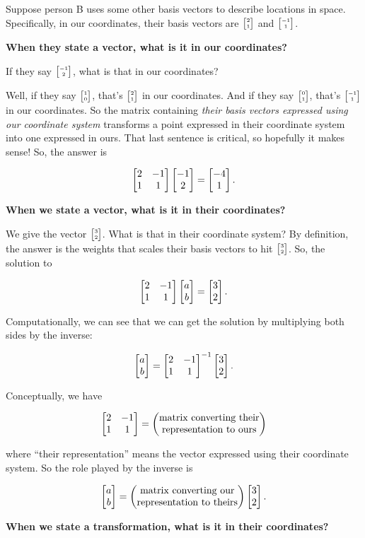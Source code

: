 Suppose person B uses some other basis vectors to describe locations in
space. Specifically, in our coordinates, their basis vectors are
$\tiny{\begin{bmatrix}2\\1\end{bmatrix}}$ and $\tiny{\begin{bmatrix}-1\\1\end{bmatrix}}$.


\textbf{When they state a vector, what is it in our coordinates?}

If they say $\tiny{\begin{bmatrix}-1\\2\end{bmatrix}}$, what is that in our coordinates?

Well, if they say $\tiny{\begin{bmatrix}1\\0\end{bmatrix}}$, that's $\tiny{\begin{bmatrix}2\\1\end{bmatrix}}$ in our coordinates. And
if they say $\tiny{\begin{bmatrix}0\\1\end{bmatrix}}$, that's $\tiny{\begin{bmatrix}-1\\1\end{bmatrix}}$ in our coordinates. So the
matrix containing \textit{their basis vectors expressed using our coordinate system}
transforms a point expressed in their coordinate system into one expressed in
ours. That last sentence is critical, so hopefully it makes sense! So, the answer is

$$
\begin{bmatrix}2 & -1\\1 &  1\\ \end{bmatrix} \begin{bmatrix}-1\\2\end{bmatrix} = \begin{bmatrix}-4\\1\end{bmatrix}.
$$


\textbf{When we state a vector, what is it in their coordinates?}

We give the vector $\tiny{\begin{bmatrix}3\\2\end{bmatrix}}$. What is that in their coordinate system? By
definition, the answer is the weights that scales their basis vectors to hit
$\tiny{\begin{bmatrix}3\\2\end{bmatrix}}$. So, the solution to

$$
\begin{bmatrix}2 & -1\\1 & 1\\ \end{bmatrix} \begin{bmatrix}a\\b\end{bmatrix} = \begin{bmatrix}3\\2\end{bmatrix}.
$$


Computationally, we can see that we can get the solution by multiplying both
sides by the inverse:

$$
\begin{bmatrix}a\\b\end{bmatrix} = \begin{bmatrix}2 & -1\\1 & 1\\ \end{bmatrix}^{-1} \begin{bmatrix}3\\2\end{bmatrix}.
$$

Conceptually, we have

$$
\begin{bmatrix}2 & -1\\1 & 1\\ \end{bmatrix} =
\begin{pmatrix}\text{matrix converting their}\\\text{representation to ours} \\ \end{pmatrix}
$$

where ``their representation'' means the vector expressed using their coordinate
system. So the role played by the inverse is

$$
\begin{bmatrix}a\\b\end{bmatrix} =
\begin{pmatrix}\text{matrix converting our}\\\text{representation to theirs} \\ \end{pmatrix}
\begin{bmatrix}3\\2\end{bmatrix}.
$$

\textbf{When we state a transformation, what is it in their coordinates?}

